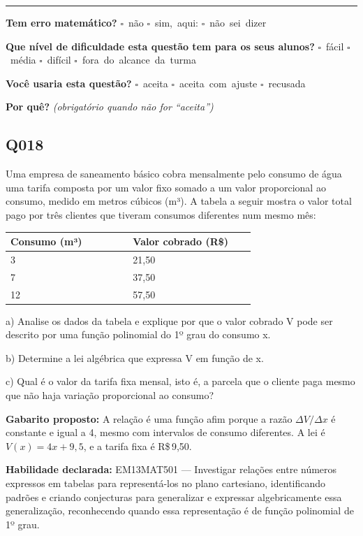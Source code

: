 \documentclass[11pt,a4paper]{article}
\begin{document}
\noindent\rule{\linewidth}{0.4pt}
\textbf{Tem erro matemático?}\quad
\mbox{$\square$~não} \quad \mbox{$\square$~sim, aqui:} \underline{\hspace{5cm}}
\quad \mbox{$\square$~não sei dizer}

\textbf{Que nível de dificuldade esta questão tem para os seus alunos?}\quad
\mbox{$\square$~fácil} \quad \mbox{$\square$~média} \quad
\mbox{$\square$~difícil} \quad \mbox{$\square$~fora do alcance da turma}

\textbf{Você usaria esta questão?}\quad
\mbox{$\square$~aceita} \quad \mbox{$\square$~aceita com ajuste} \quad
\mbox{$\square$~recusada}

\textbf{Por quê?} \emph{(obrigatório quando não for ``aceita'')}

\underline{\hspace{\linewidth}}

\underline{\hspace{\linewidth}}
\vspace{0.6em}

\begin{samepage}
\subsection*{Q018}
Uma empresa de saneamento básico cobra mensalmente pelo consumo de água uma tarifa composta por um valor fixo somado a um valor proporcional ao consumo, medido em metros cúbicos (m³). A tabela a seguir mostra o valor total pago por três clientes que tiveram consumos diferentes num mesmo mês:

\begin{center}
\begin{tabular}{|p{0.430\linewidth}|p{0.430\linewidth}|}
\hline
\textbf{Consumo (m³)} & \textbf{Valor cobrado (R\$)} \\
\hline
3 & 21,50 \\
\hline
7 & 37,50 \\
\hline
12 & 57,50 \\
\hline
\end{tabular}
\end{center}

a) Analise os dados da tabela e explique por que o valor cobrado V pode ser descrito por uma função polinomial do 1º grau do consumo x.

b) Determine a lei algébrica que expressa V em função de x.

c) Qual é o valor da tarifa fixa mensal, isto é, a parcela que o cliente paga mesmo que não haja variação proporcional ao consumo?

\textbf{Gabarito proposto:} A relação é uma função afim porque a razão $\Delta V/\Delta x$ é constante e igual a 4, mesmo com intervalos de consumo diferentes. A lei é $V(x) = 4x + 9{,}5$, e a tarifa fixa é R\$\,9,50.

\textbf{Habilidade declarada:} EM13MAT501 --- Investigar relações entre números expressos em tabelas para representá-los no plano cartesiano, identificando padrões e criando conjecturas para generalizar e expressar algebricamente essa generalização, reconhecendo quando essa representação é de função polinomial de 1º grau.
\end{samepage}
\end{document}
